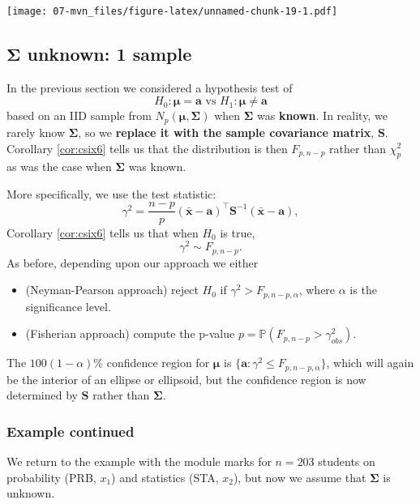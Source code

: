 \documentclass[
]{book}
\theoremstyle{definition}
\theoremstyle{definition}
\theoremstyle{definition}
\theoremstyle{definition}
\theoremstyle{remark}
\begin{document}
\texttt{[image: 07-mvn\_files/figure-latex/unnamed-chunk-19-1.pdf]}

\subsection{\texorpdfstring{\(\boldsymbol{\Sigma}\) unknown: 1 sample}{\textbackslash boldsymbol\{\textbackslash Sigma\} unknown: 1 sample}}\label{onesample}

In the previous section we considered a hypothesis test of
\[H_0: {\boldsymbol{\mu}}= \mathbf a\mbox{ vs } H_1: {\boldsymbol{\mu}}\neq \mathbf a\] based on an IID sample from \(N_p({\boldsymbol{\mu}},\boldsymbol{\Sigma})\) when \(\boldsymbol{\Sigma}\) was \textbf{known}. In reality, we rarely know \(\boldsymbol{\Sigma}\), so we \textbf{replace it with the sample covariance matrix}, \(\mathbf S\). Corollary \ref{cor:csix6} tells us that the distribution is then \(F_{p,n-p}\) rather than \(\chi^2_p\) as was the case when \(\boldsymbol{\Sigma}\) was known.

More specifically, we use the test statistic:
\[\gamma^2 = \frac{n-p}{p} (\bar{\mathbf x}-\mathbf a)^\top \mathbf S^{-1} (\bar{\mathbf x}-\mathbf a),\]
Corollary \ref{cor:csix6} tells us that when \(H_0\) is true,
\[\gamma^2 \sim F_{p,n-p}.\]
As before, depending upon our approach we either

\begin{itemize}
\item
  (Neyman-Pearson approach) reject \(H_0\) if \(\gamma^2 > F_{p,n-p,\alpha}\), where \(\alpha\) is the significance level.
\item
  (Fisherian approach) compute the p-value \(p = \mathbb{P}(F_{p,n-p} > \gamma^2_{obs})\).
\end{itemize}

The \(100(1-\alpha)\)\% confidence region for \({\boldsymbol{\mu}}\) is \(\{ \mathbf a: \gamma^2 \leq F_{p,n-p,\alpha} \}\), which will again be the interior of an ellipse or ellipsoid, but the confidence region is now determined by \(\mathbf S\) rather than \(\boldsymbol{\Sigma}\).

\subsubsection*{Example continued}\label{example-continued-1}

We return to the example with the module marks for \(n=203\) students on probability (PRB, \(x_1\)) and statistics (STA, \(x_2\)), but now we assume that \(\boldsymbol{\Sigma}\) is unknown.
\end{document}
